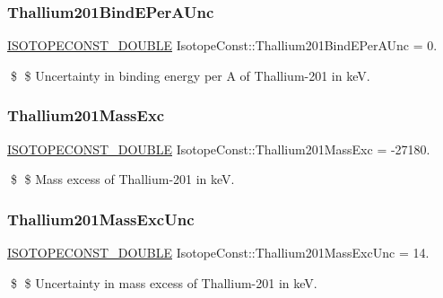 \subsubsection{\texorpdfstring{Thallium201\+Bind\+E\+Per\+A\+Unc}{Thallium201BindEPerAUnc}}
{\footnotesize\ttfamily \mbox{\hyperlink{group___isotope_const-_macros_ga8f45a7272ce02c0b4c65c44636ed719a}{I\+S\+O\+T\+O\+P\+E\+C\+O\+N\+S\+T\+\_\+\+D\+O\+U\+B\+LE}} Isotope\+Const\+::\+Thallium201\+Bind\+E\+Per\+A\+Unc = 0.}

\$ \$ Uncertainty in binding energy per A of Thallium-\/201 in keV. \mbox{\label{group___isotope_const-_thallium-_tl201_ga746d0a38a9795b89e3d4e7bbc61a0a51}} 
\subsubsection{\texorpdfstring{Thallium201\+Mass\+Exc}{Thallium201MassExc}}
{\footnotesize\ttfamily \mbox{\hyperlink{group___isotope_const-_macros_ga8f45a7272ce02c0b4c65c44636ed719a}{I\+S\+O\+T\+O\+P\+E\+C\+O\+N\+S\+T\+\_\+\+D\+O\+U\+B\+LE}} Isotope\+Const\+::\+Thallium201\+Mass\+Exc = -\/27180.}

\$ \$ Mass excess of Thallium-\/201 in keV. \mbox{\label{group___isotope_const-_thallium-_tl201_gad0f26d70a45f14fcc49353141bafc66a}} 
\subsubsection{\texorpdfstring{Thallium201\+Mass\+Exc\+Unc}{Thallium201MassExcUnc}}
{\footnotesize\ttfamily \mbox{\hyperlink{group___isotope_const-_macros_ga8f45a7272ce02c0b4c65c44636ed719a}{I\+S\+O\+T\+O\+P\+E\+C\+O\+N\+S\+T\+\_\+\+D\+O\+U\+B\+LE}} Isotope\+Const\+::\+Thallium201\+Mass\+Exc\+Unc = 14.}

\$ \$ Uncertainty in mass excess of Thallium-\/201 in keV. \mbox{\label{group___isotope_const-_thallium-_tl201_ga4c7a8d73bbd28d4f78d9ac61590d877a}} 
